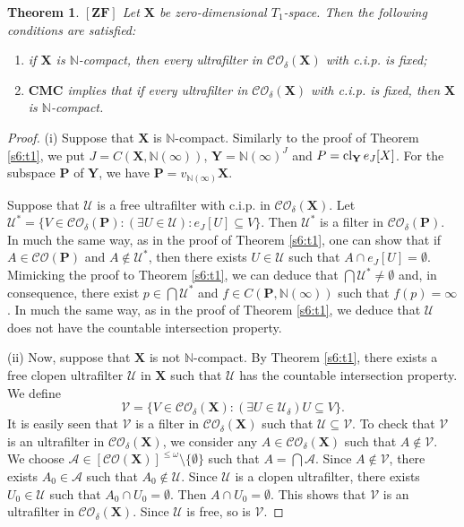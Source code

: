 \documentclass[12pt,twoside,leqno]{article}
\theoremstyle{plain}
\newtheorem{theorem}{Theorem}[section]
\theoremstyle{definition}
\theoremstyle{remark}
\DeclareMathOperator{\cl}{{\rm cl}}
\begin{document}
\begin{theorem}
	\label{s6:t5}
	$[\mathbf{ZF}]$ Let $\mathbf{X}$ be zero-dimensional $T_1$-space. Then the following conditions are satisfied:
	\begin{enumerate}
		\item[(i)] if $\mathbf{X}$ is  $\mathbb{N}$-compact, then every ultrafilter in $\mathcal{CO}_{\delta}(\mathbf{X})$ with c.i.p. is fixed;
		\item[(ii)] $\mathbf{CMC}$ implies that if every ultrafilter in $\mathcal{CO}_{\delta}(\mathbf{X})$ with c.i.p. is fixed, then $\mathbf{X}$ is $\mathbb{N}$-compact.
	\end{enumerate}
\end{theorem}
\begin{proof}
	(i) Suppose that $\mathbf{X}$ is $\mathbb{N}$-compact. Similarly to the proof of Theorem \ref{s6:t1}, we put $J= C(\mathbf{X}, \mathbb{N}(\infty))$, $\mathbf{Y}=\mathbb{N}(\infty)^{J}$ and $P=\cl_{\mathbf{Y}}e_J[X]$. For the subspace $\mathbf{P}$ of $\mathbf{Y}$, we  have $\mathbf{P}=v_{\mathbb{N}(\infty)}\mathbf{X}$. 
	
	Suppose that  $\mathcal{U}$ is a free ultrafilter with c.i.p. in $\mathcal{CO}_{\delta}(\mathbf{X})$.  Let $\mathcal{U}^{\ast}=\{V\in \mathcal{CO}_{\delta}(\mathbf{P}): (\exists U\in\mathcal{U}): e_J[U]\subseteq V\}$. Then $\mathcal{U}^{\ast}$ is a filter in $\mathcal{CO}_{\delta}(\mathbf{P})$. In much the same way, as in the proof of Theorem \ref{s6:t1}, one can show that if $A\in\mathcal{CO}(\mathbf{P})$ and $A\notin\mathcal{U}^{\ast}$, then there exists $U\in\mathcal{U}$ such that $A\cap e_J[U]=\emptyset$. Mimicking the proof to Theorem \ref{s6:t1}, we can deduce that $\bigcap\mathcal{U}^{\ast}\neq\emptyset$ and, in consequence, there exist $p\in\bigcap\mathcal{U}^{\ast}$ and $f\in C(\mathbf{P}, \mathbb{N}(\infty))$ such that $f(p)=\infty$. In much the same way, as in the proof of Theorem \ref{s6:t1}, we deduce that $\mathcal{U}$ does not have the countable intersection property.\medskip
	
	(ii) Now, suppose that $\mathbf{X}$ is not $\mathbb{N}$-compact. By Theorem \ref{s6:t1}, there exists a free clopen ultrafilter $\mathcal{U}$ in $\mathbf{X}$ such that $\mathcal{U}$ has the countable intersection property. We define
	$$\mathcal{V}=\{ V\in\mathcal{CO}_{\delta}(\mathbf{X}): (\exists U\in \mathcal{U}_{\delta}) U\subseteq V\}.$$
	It is easily seen that $\mathcal{V}$ is a filter in $\mathcal{CO}_{\delta}(\mathbf{X})$ such that $\mathcal{U}\subseteq \mathcal{V}$. To check that $\mathcal{V}$ is an ultrafilter in $\mathcal{CO}_{\delta}(\mathbf{X})$, we consider any $A\in\mathcal{CO}_{\delta}(\mathbf{X})$ such that $A\notin\mathcal{V}$. We choose $\mathcal{A}\in[\mathcal{CO}(\mathbf{X})]^{\leq\omega}\setminus\{\emptyset\}$ such that $A=\bigcap\mathcal{A}$. Since $A\notin\mathcal{V}$, there exists $A_0\in\mathcal{A}$ such that $A_0\notin\mathcal{U}$. Since $\mathcal{U}$ is a clopen ultrafilter, there exists $U_0\in\mathcal{U}$ such that $A_0\cap U_0=\emptyset$. Then $A\cap U_0=\emptyset$. This shows that $\mathcal{V}$ is an ultrafilter in $\mathcal{CO}_{\delta}(\mathbf{X})$. Since $\mathcal{U}$ is free, so is $\mathcal{V}$.
	

\end{proof}
\end{document}
